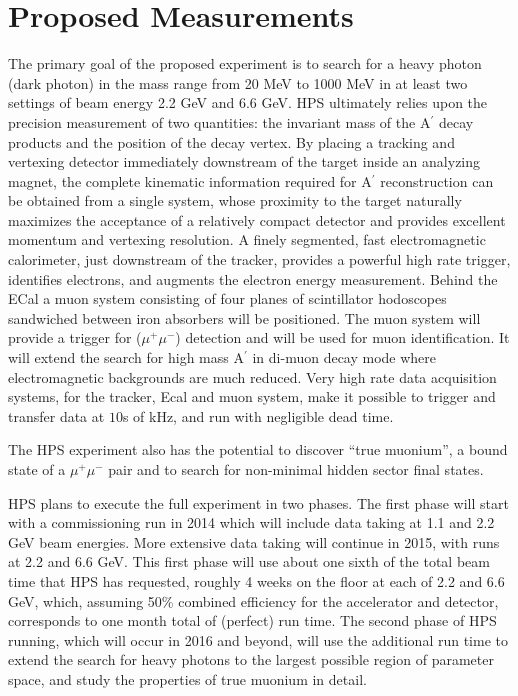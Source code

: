 \section{Proposed Measurements}
\label{sec:measurements}

The primary goal of the proposed experiment is to search for a heavy photon (dark photon) in the mass range from 20 MeV to 1000 MeV in at least two settings of beam energy 2.2 GeV and 6.6 GeV. 
HPS  ultimately relies upon the precision measurement of two quantities: the invariant mass of the A$^\prime$ decay products and the position of the decay vertex. By placing a tracking and vertexing detector immediately downstream of the target inside an analyzing magnet, the complete kinematic information required for A$^\prime$ reconstruction can be obtained from a single system, whose proximity to the target naturally maximizes the acceptance of a relatively compact detector and provides excellent momentum and vertexing resolution. A finely segmented, fast electromagnetic calorimeter, just downstream of the tracker,  provides a powerful high rate trigger, identifies electrons, and augments  the electron energy measurement. Behind the ECal a muon system consisting of four planes of scintillator hodoscopes sandwiched between iron absorbers will be positioned. The muon system will provide a trigger for ($\mu^+\mu^-$) detection and will be used for muon identification. It will extend the search for high mass A$^\prime$ in di-muon decay mode where electromagnetic backgrounds are much reduced. Very high rate data acquisition systems, for the tracker, Ecal and muon system, make it possible to trigger and transfer data at $10$s of kHz, and run with negligible dead time.

The HPS experiment also has the potential to discover ``true muonium'', a bound state of a $\mu^+ \mu^-$ pair and to search for non-minimal hidden sector final states.  

HPS plans to execute the full experiment in two phases. The first phase will start with a commissioning run in 2014 which will include data taking at 1.1 and 2.2 GeV beam energies. More extensive data taking will continue in 2015, with runs at 2.2 and 6.6 GeV. This first phase will use about one sixth of the total beam time that HPS has requested, roughly 4 weeks on the floor at each of 2.2 and 6.6 GeV, which, assuming 50\% combined efficiency for the accelerator and detector, corresponds to one month total of (perfect) run time. The second phase of HPS running, which will occur in 2016 and beyond, will use the additional run time to extend the search for heavy photons to the largest possible region of parameter space, and study the properties of true muonium in detail.

